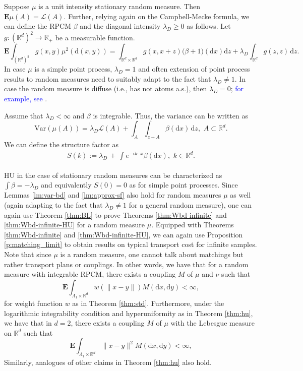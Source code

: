 \documentclass[12pt]{article}
\newcommand{\R}{\mathbb{R}}
\newcommand{\Leb}{\mathcal{L}}
\newcommand{\br}{\beta}%
\newcommand{\1}{\mathbf{1}}
\newcommand{\md}{\mathrm{d}}
\newcommand{\E}{\mathbf  E}
\newcommand{\var}{\text{Var}}
\newcommand{\blue}[1]{\textcolor{blue}{#1}}
\newcommand{\dy}[1]{\textcolor{blue}{#1}}
\newcommand{\dy}[1]{#1}%
\begin{document}
{{{{Suppose $\mu$ is a unit intensity stationary random measure. Then $\E \mu(A) = \Leb(A)$. Further, {relying again on the Campbell-Mecke formula}, we can define the RPCM $\beta$ and the diagonal intensity $\lambda_D \geq 0$ as follows. Let $g : (\R^d)^{2} \to \R_+$ be a measurable function.
%
\begin{equation}
\label{e:campbell1} \E \int_{(\R^d)^2} g(x,y) \mu^2(\md (x,y)) =  \int_{\R^d \times \R^d} g(x,x+z){\big(\beta + 1\big)}(\md x)\md z  + \lambda_D \int_{\R^d} g(z,z)  \, \md z.
\end{equation}
%
 {In case $\mu$ is a simple point process, $\lambda_D = 1$ and often extension of point process results to random measures need to suitably adapt to the fact that $\lambda_D \neq 1$. In case the random measure is diffuse (i.e., has not atoms a.s.), then $\lambda_D = 0$;} \dy{for example, see }\cite{krishnapur2024stationary}.

Assume that $\lambda_D < \infty$ and $\beta$ is integrable. Thus, the variance can be written as
%
$$\var(\mu (A)) = \lambda_D \Leb(A) + \int_{A}\int_{z + A}\beta (\md x) \, \md z, \, \, A\subset \mathbb{R}^{d}.$$
%
We can define the structure factor as
%
\begin{align}
S(k) := \lambda_D \, + \, \int_{}e^{-ik\cdot x}\br(\md x), \, \, k \in \R^d.
\end{align}
%

HU in the case of stationary random measures can be characterized as $\int \beta = -\lambda_D$ and equivalently $S(0)= 0$ as for simple point processes. Since Lemmas \ref{lm:var-bd} and \ref{lm:approx-sf} also hold for random measures $\mu$ as well ({again adapting to the fact that $ \lambda _{D}\neq 1$ for a general random measure}), one can again use Theorem \ref{thm:BL} to prove Theorems \ref{thm:Wbd-infinite} and \ref{thm:Wbd-infinite-HU} for a random measure $\mu$. Equipped with Theorems \ref{thm:Wbd-infinite} and \ref{thm:Wbd-infinite-HU}, we can again use Proposition \ref{p:matching_limit} to obtain results on typical transport cost for infinite samples. Note that since $\mu$ is a random measure, one cannot talk about matchings but rather transport plans or couplings. In other words, we have that for a random measure with integrable RPCM, there exists a coupling $M$ of $\mu$ and $\nu$ such that
%
$$ \E \int_{\Lambda_1 \times \R^d}w(\|x-y\|)M(\md x,\md y) < \infty,$$
%
for weight function $w$ as in Theorem \ref{thm:std}. Furthermore, under the logarithmic integrability condition and hyperuniformity as in Theorem \ref{thm:hu}, we have that in $d = 2$, there exists a coupling $M$ of $\mu$ with the Lebesgue measure on $\R^d$ such that
%
$$ \E \int_{\Lambda_1 \times \R^d}\|x-y\|^2 M(\md x,\md y) < \infty,$$
%
Similarly, analogues of other claims in Theorem \ref{thm:hu} also hold.


}}}}
\end{document}

